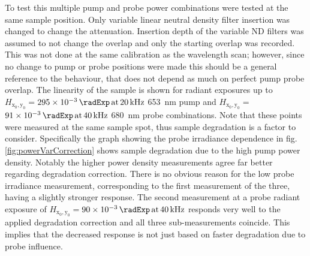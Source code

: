 \documentclass[twoside,openright,listof=numbered]{scrreprt}
\def\pumpExp#1{\ensuremath{\SI{#1}{\radExp}\,\mathrm{at}\, \SI{20}{\kilo\hertz}}}
\def\probeExp#1{\ensuremath{\SI{#1}{\radExp}\,\mathrm{at}\, \SI{40}{\kilo\hertz}}}
\def\radiantExp{\ensuremath{H_\mathrm{x_0,y_0}}}
\begin{document}
To test this multiple pump and probe power combinations were tested at the same sample position. Only variable linear neutral density filter insertion was changed to change the attenuation. Insertion depth of the variable ND filters was assumed to not change the overlap and only the starting overlap was recorded. This was not done at the same calibration as the wavelength scan; however, since no change to pump or probe positions were made this should be a general reference to the behaviour, that does not depend as much on perfect pump probe overlap. The linearity of the sample is shown for radiant exposures up to $\radiantExp=$\pumpExp{295e-3} \SI{653}{\nano\meter} pump and $\radiantExp=$\probeExp{91e-3} \SI{680}{\nano\meter} probe combinations. Note that these points were measured at the same sample spot, thus sample degradation is a factor to consider. Specifically the graph showing the probe irradiance dependence in fig. \ref{fig:powerVarCorrection} shows sample degradation due to the high pump power density. Notably the higher power density measurements agree far better regarding degradation correction. There is no obvious reason for the low probe irradiance measurement, corresponding to the first measurement of the three, having a slightly stronger response. The second measurement at a probe radiant exposure of $\radiantExp=$\probeExp{90e-3} responds very well to the applied degradation correction and all three sub-measurements coincide. This implies that the decreased response is not just based on faster degradation due to probe influence.
\end{document}
